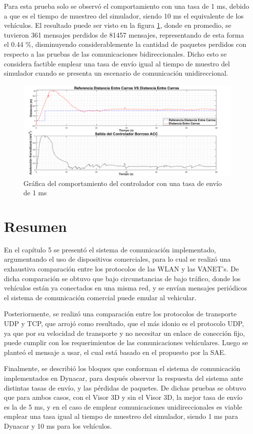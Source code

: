 \par Para esta prueba solo se observó el comportamiento con una tasa de 1 ms, debido a que es el tiempo de muestreo del simulador, siendo 10 ms el equivalente de los vehículos. El resultado puede ser visto en la figura \ref{fig:sr}, donde en promedio, se tuvieron 361 mensajes perdidos de 81457 mensajes, representando de esta forma el 0.44 \%, disminuyendo considerablemente la cantidad de paquetes perdidos con respecto a las pruebas de las comunicaciones bidireccionales. Dicho esto se considera factible emplear una tasa de envío igual al tiempo de muestro del simulador cuando se presenta un escenario de comunicación unidireccional. 
\
\begin{figure}[H]
	\centering
		\includegraphics[scale=0.4]{Imagenes/1svc}
		\caption{Gráfica del comportamiento del controlador con una tasa de envío de 1 ms}
		\label{fig:sr}
\end{figure}	  	  

\section{Resumen}
En el capítulo 5 se presentó el sistema de comunicación implementado, argumentando el uso de dispositivos comerciales, para lo cual se realizó una exhaustiva comparación entre los protocolos de las WLAN y las VANET's. De dicha comparación se obtuvo que bajo circunstancias de bajo tráfico, donde los vehículos están ya conectados en una misma red, y se envían mensajes periódicos el sistema de comunicación comercial puede emular al vehicular.\\
\par Posteriormente, se realizó una comparación entre los protocolos de transporte UDP y TCP, que arrojó como resultado, que el más idonio es el protocolo UDP, ya que por su velocidad de transporte y no necesitar un enlace de conección fijo, puede cumplir con los requerimientos de las comunicaciones vehiculares. Luego se planteó el mensaje a usar, el cual está basado en el propuesto por la SAE.\\
\par Finalmente, se describió los bloques que conforman el sistema de comunicación implementados en Dynacar, para después observar la respuesta del sistema ante distintas tasas de envío, y las pérdidas de paquetes. De dichas pruebas se obtuvo que para ambos casos, con el Visor 3D y  sin el Visor 3D, la mejor tasa de envío es la de 5 ms, y en el caso de emplear comunicaciones unidireccionales es viable emplear una tasa igual al tiempo de muestreo del simulador, siendo 1 ms para Dynacar y 10 ms para los vehículos.      